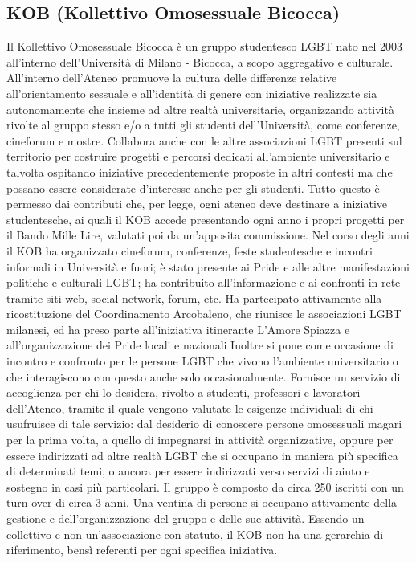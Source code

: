 \subsection{KOB (Kollettivo Omosessuale Bicocca)}
Il Kollettivo Omosessuale Bicocca è un gruppo studentesco LGBT nato nel 2003 all'interno dell'Università di Milano - Bicocca, a scopo aggregativo e culturale. 
All'interno dell'Ateneo promuove la cultura delle differenze relative all'orientamento sessuale e all'identità di genere con iniziative realizzate sia autonomamente che insieme ad altre realtà universitarie, organizzando attività rivolte al gruppo stesso e/o a tutti gli studenti dell'Università, come conferenze, cineforum e mostre. Collabora anche con le altre associazioni LGBT presenti sul territorio per costruire progetti e percorsi dedicati all'ambiente universitario e talvolta ospitando iniziative precedentemente proposte in altri contesti ma che possano essere considerate d'interesse anche per gli studenti. 
Tutto questo è permesso dai contributi che, per legge, ogni ateneo deve destinare a iniziative studentesche, ai quali il KOB accede presentando ogni anno i propri progetti per il Bando Mille Lire, valutati poi da un'apposita commissione. Nel corso degli anni il KOB ha organizzato cineforum, conferenze, feste studentesche e incontri informali in Università e fuori; è stato presente ai Pride e alle altre manifestazioni politiche e culturali LGBT; ha contribuito all'informazione e ai confronti in rete tramite siti web, social network, forum, etc. Ha partecipato attivamente alla ricostituzione del Coordinamento Arcobaleno, che riunisce le associazioni LGBT milanesi, ed ha preso parte all'iniziativa itinerante L'Amore Spiazza e all'organizzazione dei Pride locali e nazionali Inoltre si pone come occasione di incontro e confronto per le persone LGBT che vivono l'ambiente universitario o che interagiscono con questo anche solo occasionalmente. Fornisce un servizio di accoglienza per chi lo desidera, rivolto a studenti, professori e lavoratori dell'Ateneo, tramite il quale vengono valutate le esigenze individuali di chi usufruisce di tale servizio: dal desiderio di conoscere persone omosessuali magari per la prima volta, a quello di impegnarsi in attività organizzative, oppure per essere indirizzati ad altre realtà LGBT che si occupano in maniera più specifica di determinati temi, o ancora per essere indirizzati verso servizi di aiuto e sostegno in casi più particolari. 
Il gruppo è composto da circa 250 iscritti con un turn over di circa 3 anni. Una ventina di persone si occupano attivamente della gestione e dell'organizzazione del gruppo e delle sue attività. Essendo un collettivo e non un'associazione con statuto, il KOB non ha una gerarchia di riferimento, bensì referenti per ogni specifica iniziativa. 

